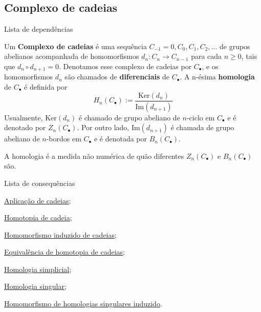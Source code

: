 \subsection{Complexo de cadeias}
\label{complexo-de-cadeias-def}
\begin{titlemize}{Lista de dependências}
	\item %
\end{titlemize}
\begin{defi}
	Um \textbf{Complexo de cadeias} é uma sequência $C_{-1}=0,C_0,C_1, C_2,...$ de grupos abelianos acompanhada de homomorfismos $d_n:C_n\rightarrow C_{n-1}$ para cada $n\ge 0$, tais que $d_{n}\circ d_{n+1}=0$. Denotamos esse complexo de cadeias por $C_{\bullet}$, e os homomorfismos $d_n$ são chamados de \textbf{diferenciais} de $C_\bullet$. A n-ésima \textbf{homologia} de $C_\bullet$ é definida por
    \[H_n(C_\bullet):=\frac{\text{Ker}(d_n)}{\text{Im}(d_{n+1})}\]
    Usualmente, $\text{Ker}(d_n)$ é chamado de grupo abeliano de $n$-ciclo em $C_\bullet$ e é denotado por $Z_n(C_\bullet)$. Por outro lado, $\text{Im}(d_{n+1})$ é chamada de grupo abeliano de $n$-bordos em $C_\bullet$ e é denotada por $B_n(C_\bullet)$.
\end{defi}

A homologia é a medida não numérica de quão diferentes $Z_n(C_\bullet)$ e $B_n(C_\bullet)$ são.

\begin{titlemize}{Lista de consequências}
    \item \hyperref[aplicacao-de-cadeias-def]{Aplicação de cadeias};\\
    \item \hyperref[homotopia-de-cadeias-def]{Homotopia de cadeia};\\
    \item \hyperref[homomorfismo-induzido-de-cadeias-prop]{Homomorfismo induzido de cadeias};\\
    \item \hyperref[equivalencia-de-homotopia-de-cadeias-def]{Equivalência de homotopia de cadeias};\\
    \item \hyperlink{homologia-simplicial-def}{Homologia simplicial};\\
    \item \hyperref[homologia-singular-def]{Homologia singular};\\
    \item \hyperref[homomorfismo-de-homologias-singulares-induzido-prop]{Homomorfismo de homologias singulares induzido}.
\end{titlemize}
